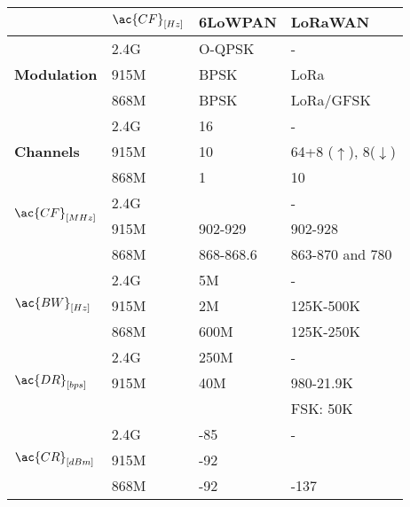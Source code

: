 \begin{poster}
{\begin{multicols}{2}
    \columnbreak
    \flushleft
	\begin{tabular}{l|l|l|l}
		\bf{}               & $\ac{CF}_{[Hz]}$ & \bf{6LoWPAN} & \bf{LoRaWAN}     \\\hline
		\multirow{3}{*}{\bf{Modulation}}   & 2.4G             & O-QPSK       & -                \\
		\                                  & 915M             & BPSK         & LoRa             \\
		\                                  & 868M             & BPSK         & LoRa/GFSK        \\\hline
		\multirow{3}{*}{\bf{Channels}}     & 2.4G             & 16           & -                \\
		\                                  & 915M             & 10           & 64+8 ($\uparrow$), 8($\downarrow$)      \\
		\                                  & 868M             & 1            & 10               \\\hline
		\multirow{2}{*}{$\ac{CF}_{[MHz]}$} & 2.4G             &              & -                \\
		\                                  & 915M             & 902-929      & 902-928          \\
		\                                  & 868M             & 868-868.6    & 863-870 and 780  \\\hline
		\multirow{3}{*}{$\ac{BW}_{[Hz]}$}  & 2.4G             & 5M           & -                \\
		\                                  & 915M             & 2M           & 125K-500K        \\
		\                                  & 868M             & 600M         & 125K-250K        \\\hline
		\multirow{3}{*}{$\ac{DR}_{[bps]}$} & 2.4G             & 250M         & -                \\
		\                                  & 915M             & 40M          & 980-21.9K        \\
		\                                  &                  &              & FSK:	50K         \\\hline
		\multirow{3}{*}{$\ac{CR}_{[dBm]}$} & 2.4G             & -85          & -                \\
		\                                  & 915M             & -92          &                  \\
		\                                  & 868M             & -92          & -137             \\\hline
	\end{tabular}
	\label{tab:name}
\end{multicols}

}
\end{poster}
